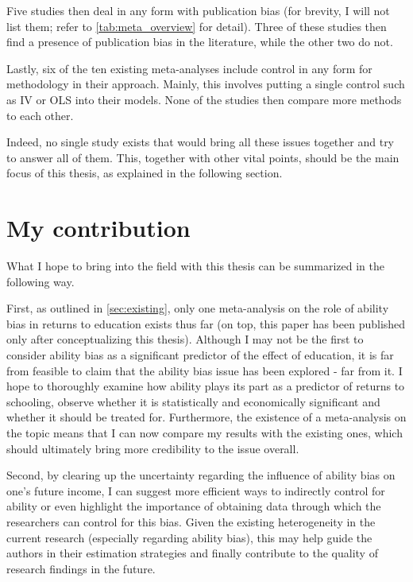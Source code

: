Five studies then deal in any form with publication bias (for brevity, I will not list them; refer to \autoref{tab:meta_overview} for detail). Three of these studies then find a presence of publication bias in the literature, while the other two do not.

Lastly, six of the ten existing meta-analyses include control in any form for methodology in their approach. Mainly, this involves putting a single control such as \ac{IV} or \ac{OLS} into their models. None of the studies then compare more methods to each other.

Indeed, no single study exists that would bring all these issues together and try to answer all of them. This, together with other vital points, should be the main focus of this thesis, as explained in the following section.

\section{My contribution}
\label{sec:contribution}

What I hope to bring into the field with this thesis can be summarized in the following way.

First, as outlined in \autoref{sec:existing}, only one meta-analysis on the role of ability bias in returns to education exists thus far (on top, this paper has been published only after conceptualizing this thesis). Although I may not be the first to consider ability bias as a significant predictor of the effect of education, it is far from feasible to claim that the ability bias issue has been explored - far from it. I hope to thoroughly examine how ability plays its part as a predictor of returns to schooling, observe whether it is statistically and economically significant and whether it should be treated for. Furthermore, the existence of a meta-analysis on the topic means that I can now compare my results with the existing ones, which should ultimately bring more credibility to the issue overall.

Second, by clearing up the uncertainty regarding the influence of ability bias on one's future income, I can suggest more efficient ways to indirectly control for ability or even highlight the importance of obtaining data through which the researchers can control for this bias. Given the existing heterogeneity in the current research (especially regarding ability bias), this may help guide the authors in their estimation strategies and finally contribute to the quality of research findings in the future.

